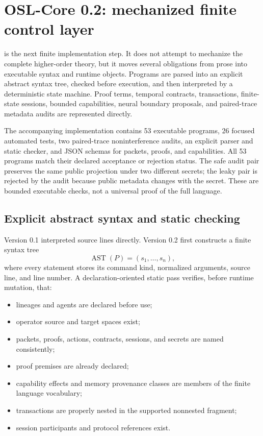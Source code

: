 \section{OSL-Core 0.2: mechanized finite control layer}
\label{sec:osl-v02}

 is the next finite implementation step.  It does not attempt to
mechanize the complete higher-order theory, but it moves several obligations
from prose into executable syntax and runtime objects.  Programs are parsed
into an explicit abstract syntax tree, checked before execution, and then
interpreted by a deterministic state machine.  Proof terms, temporal
contracts, transactions, finite-state sessions, bounded capabilities, neural
boundary proposals, and paired-trace metadata audits are represented directly.

\begin{statusbox}
The accompanying implementation contains 53 executable programs, 26 focused
automated tests, two paired-trace noninterference audits, an explicit parser and
static checker, and JSON schemas for packets, proofs, and capabilities.  All 53
programs match their declared acceptance or rejection status.  The safe audit
pair preserves the same public projection under two different secrets; the
leaky pair is rejected by the audit because public metadata changes with the
secret.  These are bounded executable checks, not a universal proof of the
full language.
\end{statusbox}

\subsection{Explicit abstract syntax and static checking}

Version 0.1 interpreted source lines directly.  Version 0.2 first constructs a
finite syntax tree
\[
  \operatorname{AST}(P)
  = (s_1,\ldots,s_n),
\]
where every statement stores its command kind, normalized arguments, source
line, and line number.  A declaration-oriented static pass verifies, before
runtime mutation, that:
\begin{itemize}[leftmargin=1.6em]
  \item lineages and agents are declared before use;
  \item operator source and target spaces exist;
  \item packets, proofs, actions, contracts, sessions, and secrets are named
  consistently;
  \item proof premises are already declared;
  \item capability effects and memory provenance classes are members of the
  finite language vocabulary;
  \item transactions are properly nested in the supported nonnested fragment;
  \item session participants and protocol references exist.
\end{itemize}


